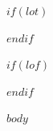 \documentclass[twoside,12pt,final]{ucthesis-CA2012}
\begin{document}
\begin{ucfrontmatter}
% 
% 
% 
% 
% 
% 

  \begin{abstract}

    $abstract$

  \end{abstract}

	\tableofcontents

	$if(lot)$
  \listoftables
  $endif$

  $if(lof)$
  \listoffigures
  $endif$

\end{ucfrontmatter}

\begin{ucmainmatter}

$body$

\end{ucmainmatter}
\end{document}
